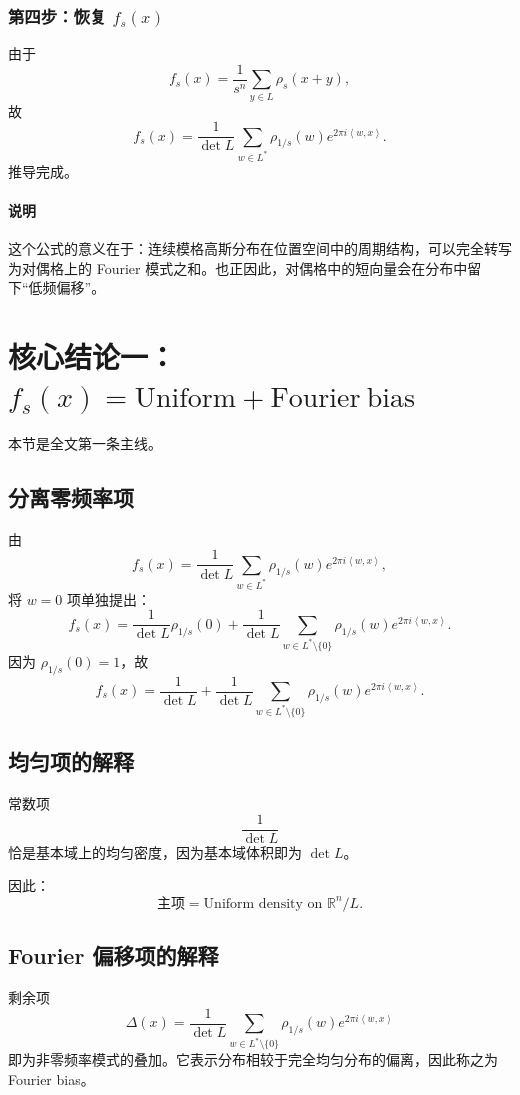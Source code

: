 \documentclass[12pt,a4paper]{ctexart}
\newcommand{\R}{\mathbb{R}}
\newcommand{\dual}{^{*}}
\newcommand{\ip}[2]{\left\langle #1,#2\right\rangle}
\begin{document}
\subsubsection*{第四步：恢复 \(f_s(x)\)}

由于
\[
f_s(x)=\frac{1}{s^n}\sum_{y\in L}\rho_s(x+y),
\]
故
\[
f_s(x)
=
\frac{1}{\det L}\sum_{w\in L\dual}\rho_{1/s}(w)e^{2\pi i\ip{w}{x}}.
\]
推导完成。

\paragraph{说明}
这个公式的意义在于：连续模格高斯分布在位置空间中的周期结构，可以完全转写为对偶格上的 Fourier 模式之和。也正因此，对偶格中的短向量会在分布中留下“低频偏移”。

\section{核心结论一：\texorpdfstring{$f_s(x)=\mathrm{Uniform}+\mathrm{Fourier\ bias}$}{fs(x)=Uniform+Fourier bias}}

本节是全文第一条主线。

\subsection{分离零频率项}

由
\[
f_s(x)
=
\frac{1}{\det L}\sum_{w\in L\dual}\rho_{1/s}(w)e^{2\pi i\ip{w}{x}},
\]
将 \(w=0\) 项单独提出：
\[
f_s(x)
=
\frac{1}{\det L}\rho_{1/s}(0)
+
\frac{1}{\det L}\sum_{w\in L\dual\setminus\{0\}}
\rho_{1/s}(w)e^{2\pi i\ip{w}{x}}.
\]
因为 \(\rho_{1/s}(0)=1\)，故
\[
f_s(x)
=
\frac{1}{\det L}
+
\frac{1}{\det L}\sum_{w\in L\dual\setminus\{0\}}
\rho_{1/s}(w)e^{2\pi i\ip{w}{x}}.
\]

\subsection{均匀项的解释}

常数项
\[
\frac{1}{\det L}
\]
恰是基本域上的均匀密度，因为基本域体积即为 \(\det L\)。

因此：
\[
\text{主项}=\text{Uniform density on }\R^n/L.
\]

\subsection{Fourier 偏移项的解释}

剩余项
\[
\Delta(x)=
\frac{1}{\det L}\sum_{w\in L\dual\setminus\{0\}}
\rho_{1/s}(w)e^{2\pi i\ip{w}{x}}
\]
即为非零频率模式的叠加。它表示分布相较于完全均匀分布的偏离，因此称之为 Fourier bias。
\end{document}
